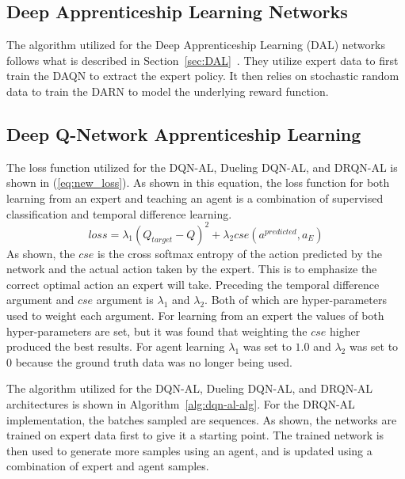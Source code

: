 \documentclass[12pt,american]{report}
\begin{document}
\subsection{Deep Apprenticeship Learning Networks}
The algorithm utilized for the Deep Apprenticeship Learning (DAL) networks follows what is described in Section~\ref{sec:DAL}~\cite{markovikj2014deep}.  They utilize expert data to first train the DAQN to extract the expert policy. It then relies on stochastic random data to train the DARN to model the underlying reward function.

\subsection{Deep Q-Network Apprenticeship Learning}
The loss function utilized for the DQN-AL, Dueling DQN-AL, and DRQN-AL is shown in (\ref{eq:new_loss}). As shown in this equation, the loss function for both learning from an expert and teaching an agent is a combination of supervised classification and temporal difference learning.  
\begin{equation}
     \label{eq:new_loss}
     loss =\lambda_{1}(Q_{target}-Q)^2 + \lambda_{2}cse(a^{predicted},a_E)%
\end{equation}
As shown, the $cse$ is the cross softmax entropy of the action predicted by the network and the actual action taken by the expert. This is to emphasize the correct optimal action an expert will take. Preceding the temporal difference argument and $cse$ argument is $\lambda_{1}$ and $\lambda_{2}$.  Both of which are hyper-parameters used to weight each argument.  For learning from an expert the values of both hyper-parameters are set, but it was found that weighting the $cse$ higher produced the best results.  For agent learning $\lambda_{1}$ was set to $1.0$ and $\lambda_{2}$ was set to 0 because the ground truth data was no longer being used.

The algorithm utilized for the DQN-AL, Dueling DQN-AL, and DRQN-AL architectures is shown in Algorithm~\ref{alg:dqn-al-alg}. For the DRQN-AL implementation, the batches sampled are sequences. As shown, the networks are trained on expert data first to give it a starting point.  The trained network is then used to generate more samples using an agent, and is updated using a combination of expert and agent samples.
\end{document}
